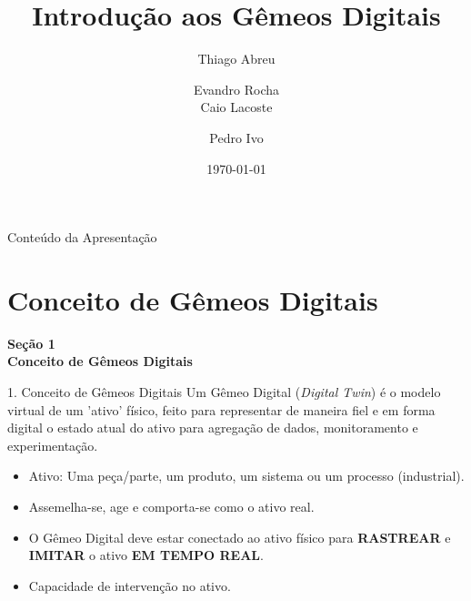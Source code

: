\documentclass[aspectratio=169,xcolor=dvipsnames]{beamer}
\title{Introdução aos Gêmeos Digitais}
\author{%
Thiago Abreu \and Evandro Rocha  \\%
Caio Lacoste \and Pedro Ivo %
}
\date{\today}
\institute{Laboratório de Processamento de Sinais (LPS)}
\begin{document}
\begin{frame}[plain]
    \titlepage
\end{frame}

\begin{frame}{Conteúdo da Apresentação}
    \tableofcontents
\end{frame}

\section{Conceito de Gêmeos Digitais}

\begin{frame}[plain]
    \vfill
    \centering
    {\Large\textcolor{dexpiBlue}{\textbf{Seção 1}}}\\[0.8em]
    {\LARGE\textbf{Conceito de Gêmeos Digitais}}\\[0.6em]
    \vfill
\end{frame}

\begin{frame}{1. Conceito de Gêmeos Digitais}
Um Gêmeo Digital (\textit{Digital Twin}) é o modelo virtual de um 'ativo' físico, feito para representar de maneira fiel e em forma digital o estado atual do ativo para agregação de dados, monitoramento e experimentação.
\begin{itemize}
    \item Ativo: Uma peça/parte, um produto, um sistema ou um processo (industrial).
    \item Assemelha-se, age e comporta-se como o ativo real.
    \item O Gêmeo Digital deve estar conectado ao ativo físico para \textbf{RASTREAR} e \textbf{IMITAR} o ativo \textbf{EM TEMPO REAL}.
    \item Capacidade de intervenção no ativo.
\end{itemize}
    
\end{frame}
\end{document}
